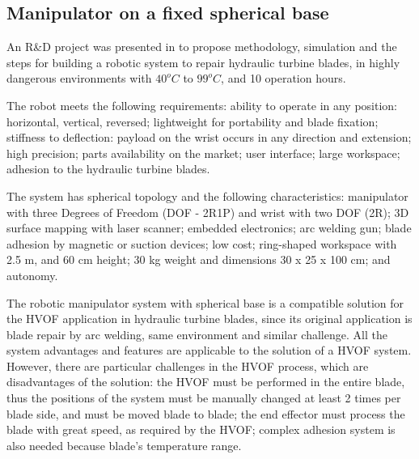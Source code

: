\subsection{Manipulator on a fixed spherical base}
An R\&D project was presented in \cite{motta2010prototype} to propose
methodology, simulation and the steps for building a robotic system to repair
hydraulic turbine blades, in highly dangerous environments with $ 40^o C$ to $
99^o C$, and 10 operation hours.


The robot meets the following requirements: ability to operate in any position:
horizontal, vertical, reversed; lightweight for portability and blade fixation;
stiffness to deflection: payload on the wrist occurs in any direction and
extension; high precision; parts availability on the market; user interface;
large workspace; adhesion to the hydraulic turbine blades.


The system has spherical topology and the following characteristics: manipulator
with three Degrees of Freedom (DOF - 2R1P) and wrist with two DOF (2R); 3D
surface mapping with laser scanner; embedded electronics; arc welding gun; blade adhesion by magnetic or
suction devices; low cost; ring-shaped workspace with 2.5 m, and 60 cm height;
30 kg weight and dimensions 30 x 25 x 100 cm; and autonomy.


The robotic manipulator system with spherical base is a compatible solution
for the HVOF application in hydraulic turbine blades, since its
original application is blade repair by arc welding, same environment and
similar challenge. All the system advantages and features are applicable to
the solution of a HVOF system. However, there are particular challenges in the
HVOF process, which are disadvantages of the solution: the HVOF must be
performed in the entire blade, thus the positions of the system must be
manually changed at least 2 times per blade side, and must be moved blade to
blade; the end effector must process the blade with great speed, as required
by the HVOF; complex adhesion system is also needed because blade's temperature
range.
